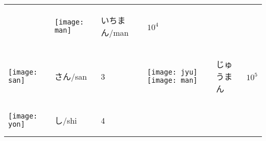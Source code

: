 \documentclass[a4paper,12pt]{extarticle}
\begin{document}
\begin{longtable}{|lll|lll|}
	                                   &
	\begin{minipage}{0.2\textwidth}
		\centerline{
			\texttt{[image: man]}
		}
	\end{minipage}
	                                   &
	\begin{CJK}{UTF8}{min}いちまん/man\end{CJK}
	                                   &
	$10^{4}$
	\\
	\begin{minipage}{0.2\textwidth}
		\centerline{
			\texttt{[image: san]}
		}
	\end{minipage}
	                                   &
	\begin{CJK}{UTF8}{min}さん/san\end{CJK}
	                                   &
	3

	                                   &
	\begin{minipage}{0.2\textwidth}
		\centerline{
			\texttt{[image: jyu]}
			\texttt{[image: man]}
		}
	\end{minipage}
	                                   &
	\begin{CJK}{UTF8}{min}じゅうまん\end{CJK}
	                                   &
	$10^{5}$
	\\
	\begin{minipage}{0.2\textwidth}
		\centerline{
			\texttt{[image: yon]}
		}
	\end{minipage}
	                                   &
	\begin{CJK}{UTF8}{min}し/shi\end{CJK}
	                                   &
	4


\end{longtable}
\end{document}

